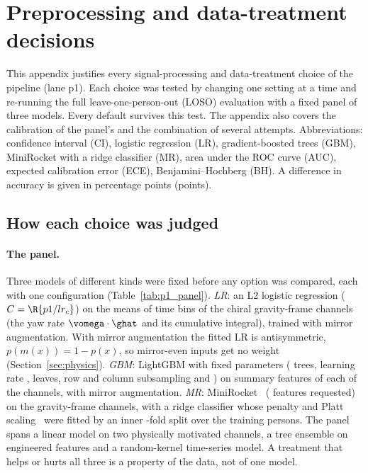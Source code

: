 \section{Preprocessing and data-treatment decisions}\label{app:prep}

This appendix justifies every signal-processing and data-treatment choice of the pipeline (lane p1).
Each choice was tested by changing one setting at a time and re-running the full leave-one-person-out
(LOSO) evaluation with a fixed panel of three models.
Every default survives this test. The appendix also covers the calibration of the panel's \pright{} and
the combination of several attempts.
Abbreviations: confidence interval (CI), logistic regression (LR), gradient-boosted trees (GBM),
MiniRocket with a ridge classifier (MR), area under the ROC curve (AUC), expected calibration error (ECE),
Benjamini--Hochberg (BH). A difference in accuracy is given in percentage points (points).

\subsection{How each choice was judged}\label{app:prep:method}

\paragraph{The panel.} Three models of different kinds were fixed before any option was compared, each
with one configuration (Table~\ref{tab:p1_panel}).
\emph{LR}: an L2 logistic regression ($C = \R{p1/lr_c}$) on the means of  time bins of the
 chiral gravity-frame channels (the yaw rate $\vomega\cdot\ghat$ and its cumulative
integral), trained with mirror augmentation.
With mirror augmentation the fitted LR is antisymmetric, $p(m(x)) = 1 - p(x)$, so mirror-even inputs get no
weight (Section~\ref{sec:physics}).
\emph{GBM}: LightGBM with fixed parameters ( trees, learning rate
,  leaves, row and column subsampling  and
) on  summary features of each of the
 channels, with mirror augmentation.
\emph{MR}: MiniRocket~\cite{dempster2021minirocket} ( features requested) on the
 gravity-frame channels, with a ridge classifier whose penalty and Platt
scaling~\cite{platt1999probabilistic} were fitted by an inner -fold split over the
training persons.
The panel spans a linear model on two physically motivated channels, a tree ensemble on engineered features
and a random-kernel time-series model. A treatment that helps or hurts all three is a property of the data,
not of one model.

